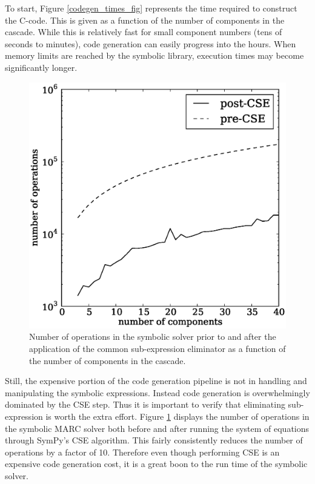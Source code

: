 \documentclass[preprint,12pt]{elsarticle}
\begin{document}
To start, Figure \ref{codegen_times_fig} represents the time required to construct 
the C-code.  This is given as a function of the number of components in the cascade.
While this is relatively fast for small component numbers (tens of seconds to minutes),
code generation can easily progress into the hours. 
When memory limits are reached by the 
symbolic library, execution times may become significantly longer.

\begin{figure}[htpb]
\begin{center}
\includegraphics[scale=0.5]{numops.eps}
\caption{Number of operations in the symbolic solver prior to and after the 
    application of the common sub-expression eliminator as a function of the
    number of components in the cascade.}
\label{numops_fig}
\end{center}
\end{figure}

Still, the expensive portion of the code generation pipeline is not in handling 
and manipulating the symbolic expressions.  Instead code generation is overwhelmingly
dominated by the CSE step.  Thus it is important to verify that eliminating
sub-expression is worth the extra effort.  Figure \ref{numops_fig} displays the
number of operations in the symbolic MARC solver both before and after running the 
system of equations through SymPy's CSE algorithm.  This fairly consistently reduces
the number of operations by a factor of 10.   Therefore even though
performing CSE is an expensive code generation cost, it is a great boon to the 
run time of the symbolic solver.
\end{document}

